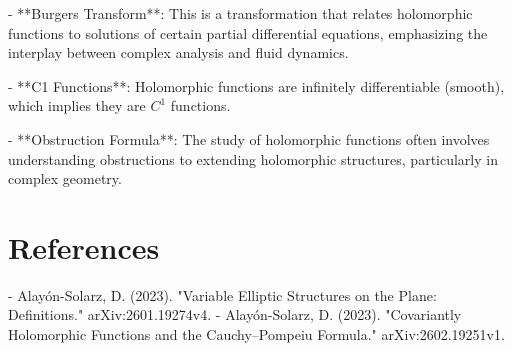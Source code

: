 \documentclass[11pt,a4paper]{article}
\begin{document}
- **Burgers Transform**: This is a transformation that relates holomorphic functions to solutions of certain partial differential equations, emphasizing the interplay between complex analysis and fluid dynamics.

- **C1 Functions**: Holomorphic functions are infinitely differentiable (smooth), which implies they are \( C^1 \) functions.

- **Obstruction Formula**: The study of holomorphic functions often involves understanding obstructions to extending holomorphic structures, particularly in complex geometry.

\section{References}
- Alayón-Solarz, D. (2023). "Variable Elliptic Structures on the Plane: Definitions." arXiv:2601.19274v4.
- Alayón-Solarz, D. (2023). "Covariantly Holomorphic Functions and the Cauchy–Pompeiu Formula." arXiv:2602.19251v1.
\end{document}
